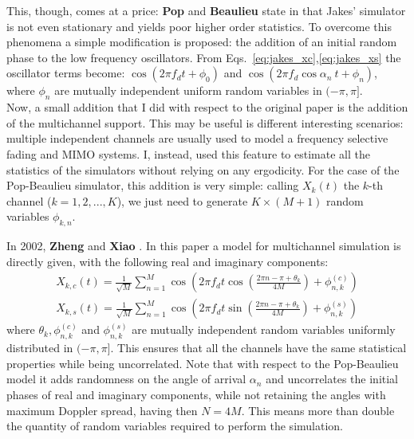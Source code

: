 This, though, comes at a price: \textbf{Pop} and \textbf{Beaulieu} state in \cite{A1} that Jakes' simulator is not even stationary and yields poor higher order statistics. To overcome this phenomena a simple modification is proposed: the addition of an initial random phase to the low frequency oscillators. From Eqs.~\ref{eq:jakes_xc},\ref{eq:jakes_xs} the oscillator terms become: $\cos(2\pi f_d t + \phi_0)$ and $\cos( 2\pi f_d \cos \alpha_n \ t + \phi_n)$, where $\phi_n$ are mutually independent uniform random variables in $(-\pi,\pi]$.\\
Now, a small addition that I did with respect to the original paper is the addition of the multichannel support. This may be useful is different interesting scenarios: multiple independent channels are usually used to model a frequency selective fading and MIMO systems. I, instead, used this feature to estimate all the statistics of the simulators without relying on any ergodicity. For the case of the Pop-Beaulieu simulator, this addition is very simple: calling $X_k(t)$ the $k$-th channel ($k=1,2,...,K$), we just need to generate $K \times(M+1)$ random variables $\phi_{k,n}$.

In 2002, \textbf{Zheng} and \textbf{Xiao} \cite{C2}. In this paper a model for multichannel simulation is directly given, with the following real and imaginary components:%
%
\begin{subequations}
\begin{align}
X_{k,c}(t) = \frac{1}{\sqrt{M}} \sum_{n=1}^{M} \cos \left( 2\pi f_d t \cos \left( \frac{2\pi n - \pi + \theta_k}{4M}\right) + \phi_{n,k}^{(c)} \right)\\
X_{k,s}(t) = \frac{1}{\sqrt{M}} \sum_{n=1}^{M} \cos \left( 2\pi f_d t \sin \left( \frac{2\pi n - \pi + \theta_k}{4M}\right) + \phi_{n,k}^{(s)} \right)
\end{align}
\end{subequations}%
%
where $\theta_k,\phi_{n,k}^{(c)}$ and $\phi_{n,k}^{(s)}$ are mutually independent random variables uniformly distributed in $(-\pi,\pi]$. This ensures that all the channels have the same statistical properties while being uncorrelated. Note that with respect to the Pop-Beaulieu model it adds randomness on the angle of arrival $\alpha_n$ and uncorrelates the initial phases of real and imaginary components, while not retaining the angles with maximum Doppler spread, having then $N=4M$. This means more than double the quantity of random variables required to perform the simulation.

